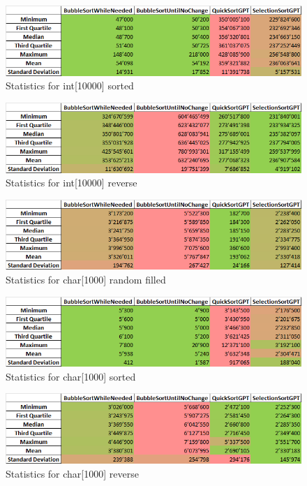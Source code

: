 \documentclass{article}
\begin{document}
    \begin{figure}[!h]
        \centering
        \includegraphics[width=0.75\linewidth]{int10000sort-stat.png}
        \caption{Statistics for int[10000] sorted}
        \label{fig:int10000sort-stat}
    \end{figure}
    \begin{figure}[!h]
        \centering
        \includegraphics[width=0.75\linewidth]{int10000rev-stat.png}
        \caption{Statistics for int[10000] reverse}
        \label{fig:int10000rev-stat}
    \end{figure}
    \begin{figure}[!h]
        \centering
        \includegraphics[width=0.75\linewidth]{char1000rand-stat.png}
        \caption{Statistics for char[1000] random filled}
        \label{fig:char1000rand-stat}
    \end{figure}
    \begin{figure}[!h]
        \centering
        \includegraphics[width=0.75\linewidth]{char1000sort-stat.png}
        \caption{Statistics for char[1000] sorted}
        \label{fig:char1000sort-stat}
    \end{figure}
    \begin{figure}[!h]
        \centering
        \includegraphics[width=0.75\linewidth]{char1000rev-stat.png}
        \caption{Statistics for char[1000] reverse}
        \label{fig:char1000rev-stat}
    \end{figure}
\end{document}
